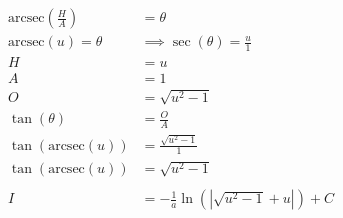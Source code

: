 \documentclass[12pt]{article}
\begin{document}
\begin{align}
    \text{arcsec}\left(\frac{H}{A}\right)                  & = \theta                                                                                                                                                      \\
    \text{arcsec}(u) = \theta                              & \implies \sec(\theta) = \frac{u}{1}                                                                                                                           \\
    H                                                      & = u                                                                                                                                                           \\
    A                                                      & = 1                                                                                                                                                           \\
    O                                                      & = \sqrt{u^2-1}                                                                                                                                                \\
    \tan(\theta)                                           & = \frac{O}{A}                                                                                                                                                 \\
    \tan(\text{arcsec}(u))                                 & = \frac{\sqrt{u^2-1}}{1}                                                                                                                                      \\
    \tan(\text{arcsec}(u))                                 & = \sqrt{u^2-1}                                                                                                                                                \\
    \nonumber                                                                                                                                                                                                              \\
    I                                                      & = -\frac{1}{a} \ln(|\sqrt{u^2-1}+u|) + C                                                                                                                      \\

\end{align}
\end{document}
